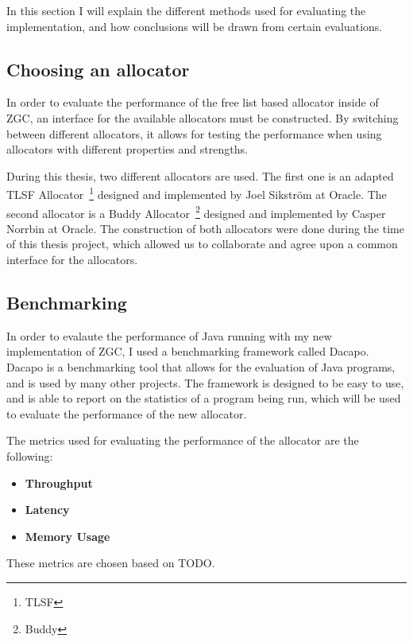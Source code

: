 In this section I will explain the different methods used for evaluating the implementation, and how conclusions will be drawn from certain evaluations.

\subsection{Choosing an allocator}
In order to evaluate the performance of the free list based allocator inside of ZGC, an interface for the available allocators must be constructed. By switching between different allocators, it allows for testing the performance when using allocators with different properties and strengths.

During this thesis, two different allocators are used. The first one is an adapted TLSF Allocator~\footnote{TLSF} designed and implemented by Joel Sikström at Oracle. The second allocator is a Buddy Allocator~\footnote{Buddy} designed and implemented by Casper Norrbin at Oracle. The construction of both allocators were done during the time of this thesis project, which allowed us to collaborate and agree upon a common interface for the allocators.

\subsection{Benchmarking}
In order to evalaute the performance of Java running with my new implementation of ZGC, I used a benchmarking framework called Dacapo. Dacapo is a benchmarking tool that allows for the evaluation of Java programs, and is used by many other projects. The framework is designed to be easy to use, and is able to report on the statistics of a program being run, which will be used to evaluate the performance of the new allocator.

The metrics used for evaluating the performance of the allocator are the following:
\begin{itemize}
    \item \textbf{Throughput}
    \item \textbf{Latency}
    \item \textbf{Memory Usage}
\end{itemize}
These metrics are chosen based on TODO.
